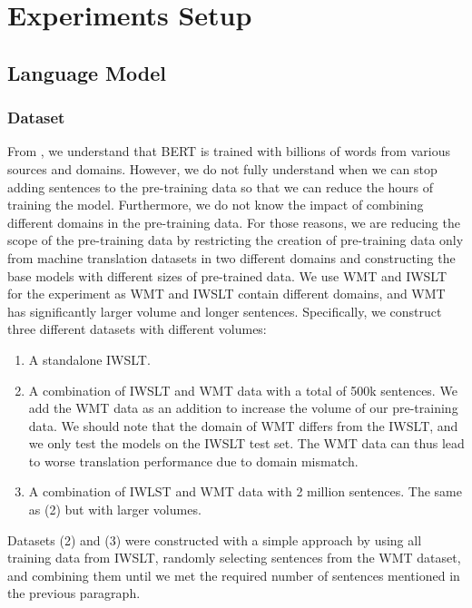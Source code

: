 \section{Experiments Setup}
\subsection{Language Model}
\label{ssec:langmodel}
\subsubsection{Dataset}
From \cite{devlin2018bert}, we understand that BERT is trained with billions of words from various sources and domains. However, we do not fully understand when we can stop adding sentences to the pre-training data so that we can reduce the hours of training the model. Furthermore, we do not know the impact of combining different domains in the pre-training data. For those reasons, we are reducing the scope of the pre-training data by restricting the creation of pre-training data only from machine translation datasets in two different domains and constructing the base models with different sizes of pre-trained data. We use WMT and IWSLT for the experiment as WMT and IWSLT contain different domains, and WMT has significantly larger volume and longer sentences. Specifically, we construct three different datasets with different volumes:
\begin{enumerate}
    \item A standalone IWSLT.
    \item A combination of IWSLT and WMT data with a total of 500k sentences. We add the WMT data as an addition to increase the volume of our pre-training data. We should note that the domain of WMT differs from the IWSLT, and we only test the models on the IWSLT test set. The WMT data can thus lead to worse translation performance due to domain mismatch.
    \item A combination of IWLST and WMT data with 2 million sentences. The same as (2) but with larger volumes.
\end{enumerate}

Datasets (2) and (3) were constructed with a simple approach by using all training data from IWSLT, randomly selecting sentences from the WMT dataset, and combining them until we met the required number of sentences mentioned in the previous paragraph.

